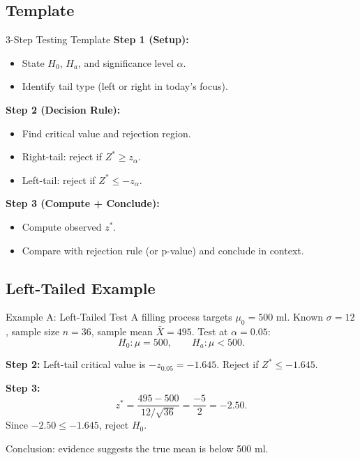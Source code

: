 \documentclass[aspectratio=169]{beamer}
\begin{document}
\subsection{Template}
\begin{frame}{3-Step Testing Template}
  \textbf{Step 1 (Setup):}
  \begin{itemize}
    \item State \(H_0\), \(H_a\), and significance level \(\alpha\).
    \item Identify tail type (left or right in today's focus).
  \end{itemize}

  \vspace{1mm}
  \textbf{Step 2 (Decision Rule):}
  \begin{itemize}
    \item Find critical value and rejection region.
    \item Right-tail: reject if \(Z^*\ge z_{\alpha}\).
    \item Left-tail: reject if \(Z^*\le -z_{\alpha}\).
  \end{itemize}

  \vspace{1mm}
  \textbf{Step 3 (Compute + Conclude):}
  \begin{itemize}
    \item Compute observed \(z^*\).
    \item Compare with rejection rule (or p-value) and conclude in context.
  \end{itemize}
\end{frame}

\subsection{Left-Tailed Example}
\begin{frame}{Example A: Left-Tailed Test}
  A filling process targets \(\mu_0=500\) ml.
  Known \(\sigma=12\), sample size \(n=36\), sample mean \(\bar X=495\).
  Test at \(\alpha=0.05\):
  \[
    H_0:\mu=500,\qquad H_a:\mu<500.
  \]

  \vspace{1mm}
  \textbf{Step 2:} Left-tail critical value is \(-z_{0.05}=-1.645\).
  Reject if \(Z^*\le -1.645\).

  \vspace{1mm}
  \textbf{Step 3:}
  \[
    z^*=\frac{495-500}{12/\sqrt{36}}=\frac{-5}{2}=-2.50.
  \]
  Since \(-2.50\le -1.645\), reject \(H_0\).

  \vspace{1mm}
  Conclusion: evidence suggests the true mean is below 500 ml.
\end{frame}
\end{document}
